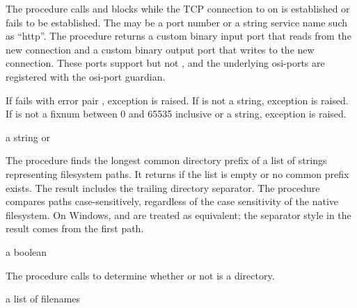 The  procedure calls  and
blocks while the TCP connection to  on 
is established or fails to be established.  The  may be
a port number or a string service name such as ``http''. The procedure
returns a custom binary input port that reads from the new connection
and a custom binary output port that writes to the new
connection. These ports support  but not
, and the underlying osi-ports are registered
with the osi-port guardian.

If  fails with error pair , exception  is
raised.  If  is not a string, exception  is raised. If  is not a
fixnum between 0 and 65535 inclusive or a string, exception
 is raised.

\begin{procedure}
\end{procedure}
\returns{} a string or 

The  procedure finds the longest common directory
prefix of a list of strings representing filesystem paths. It returns 
if the list is empty or no common prefix exists. The result includes the
trailing directory separator.
The procedure compares paths case-sensitively, regardless of the case sensitivity of the native filesystem.
On Windows, \code{/} and \code{\textbackslash} are
treated as equivalent; the separator style in the result comes from the first
path.

\begin{procedure}
\end{procedure}
\returns{} a boolean

The  procedure calls  to
determine whether or not  is a directory.

\begin{procedure}
\end{procedure}
\returns{} a list of filenames

